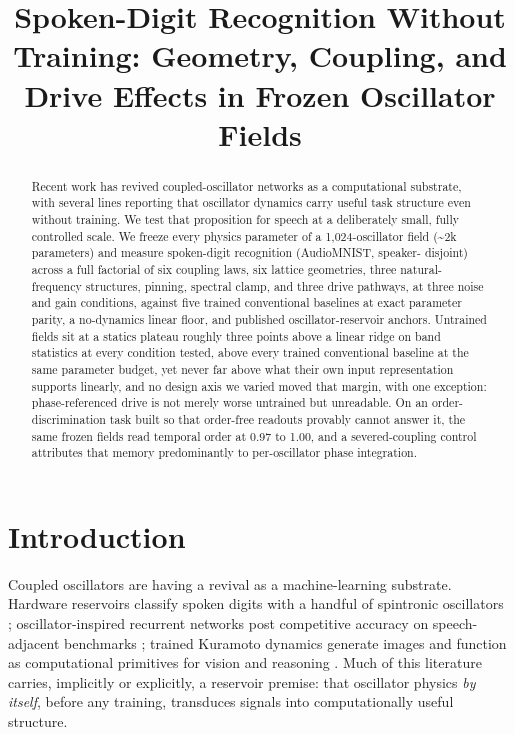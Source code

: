 \documentclass[10pt]{article}
\title{Spoken-Digit Recognition Without Training: Geometry, Coupling,
and Drive Effects in Frozen Oscillator Fields}
\author{\name }
\date{}
\makeatletter
\newcommand{\tmlr@floatbarrier}{\par\vspace{\z@}%
  \ifx\@deferlist\@empty\else\clearpage\fi}
\let\tmlr@section\section
\renewcommand{\section}{\tmlr@floatbarrier\tmlr@section}
\makeatother
\begin{document}
\maketitle
\begin{abstract}
Recent work has revived coupled-oscillator networks as a computational
substrate, with several lines reporting that oscillator dynamics carry
useful task structure even without training. We test that proposition
for speech at a deliberately small, fully controlled scale. We freeze
every physics parameter of a 1,024-oscillator field (\textasciitilde2k
parameters) and measure spoken-digit recognition (AudioMNIST, speaker-
disjoint) across a full factorial of six coupling laws, six lattice
geometries, three natural-frequency structures, pinning, spectral clamp,
and three drive pathways, at three noise and gain conditions, against
five trained conventional baselines at exact parameter parity, a
no-dynamics linear floor, and published oscillator-reservoir anchors.
Untrained fields sit at a statics plateau roughly three points above a
linear ridge on band statistics at every condition tested, above every
trained conventional baseline at the same parameter budget, yet never
far above what their own input representation supports linearly, and no
design axis we varied moved that margin, with one exception:
phase-referenced drive is not merely worse untrained but unreadable. On
an order-discrimination task built so that order-free readouts provably
cannot answer it, the same frozen fields read temporal order at 0.97 to
1.00, and a severed-coupling control attributes that memory
predominantly to per-oscillator phase integration.
\end{abstract}

\section{Introduction}\label{introduction}

Coupled oscillators are having a revival as a machine-learning
substrate. Hardware reservoirs classify spoken digits with a handful of
spintronic oscillators \citep{torrejon2017}; oscillator-inspired
recurrent networks post competitive accuracy on speech-adjacent
benchmarks \citep{rusch2021}; trained Kuramoto dynamics generate images
\citep{unconv-ai2026} and function as computational primitives for
vision and reasoning \citep{miyato2025}. Much of this literature
carries, implicitly or explicitly, a reservoir premise: that oscillator
physics \emph{by itself}, before any training, transduces signals into
computationally useful structure.
\end{document}
